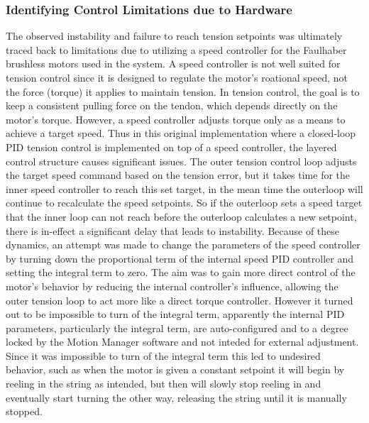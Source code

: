 \subsubsection{Identifying Control Limitations due to Hardware}
The observed instability and failure to reach tension setpoints was ultimately traced back to limitations due to utilizing a speed controller for the Faulhaber brushless motors used in the system. A speed controller is not well suited for tension control since it is designed to regulate the motor's roational speed, not the force (torque) it applies to maintain tension. In tension control, the goal is to keep a consistent pulling force on the tendon, which depends directly on the motor's torque. However, a speed controller adjusts torque only as a means to achieve a target speed. Thus in this original implementation where a closed-loop PID tension control is implemented on top of a speed controller, the layered control structure causes significant issues. The outer tension control loop adjusts the target speed command based on the tension error, but it takes time for the inner speed controller to reach this set target, in the mean time the outerloop will continue to recalculate the speed setpoints. So if the outerloop sets a speed target that the inner loop can not reach before the outerloop calculates a new setpoint, there is in-effect a significant delay that leads to instability. 
\newline \newline
Because of these dynamics, an attempt was made to change the parameters of the speed controller by turning down the proportional term of the internal speed PID controller and setting the integral term to zero. The aim was to gain more direct control of the motor's behavior by reducing the internal controller's influence, allowing the outer tension loop to act more like a direct torque controller. However it turned out to be impossible to turn of the integral term, apparently the internal PID parameters, particularly the integral term, are auto-configured and to a degree locked by the Motion Manager software and not inteded for external adjustment. Since it was impossible to turn of the integral term this led to undesired behavior, such as when the motor is given a constant setpoint it will begin by reeling in the string as intended, but then will slowly stop reeling in and eventually start turning the other way, releasing the string until it is manually stopped. 

